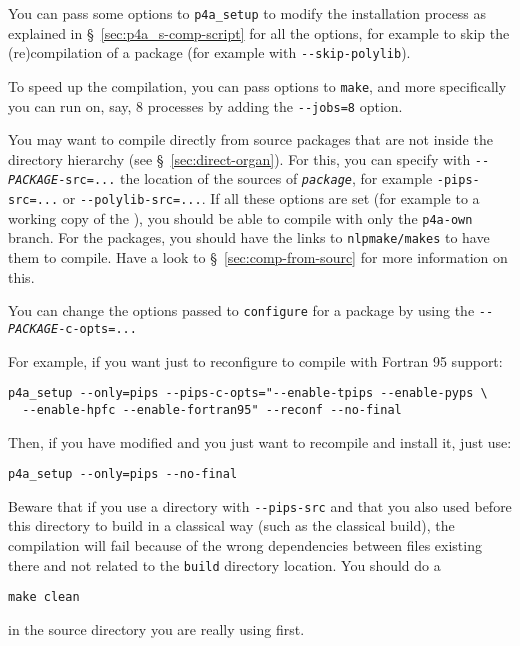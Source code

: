 \documentclass[a4paper]{article}
\begin{document}
You can pass some options to \verb|p4a_setup| to modify the
installation process as explained in \S~\ref{sec:p4a_s-comp-script} for
all the options, for example to skip the (re)compilation of a package (for
example with \verb/--skip-polylib/).

To speed up the compilation, you can pass options to \texttt{make}, and more
specifically you can run on, say, 8 processes by adding the
\verb/--jobs=8/ option.

You may want to compile \Apfa directly from source packages that are not
inside the \Apfa directory hierarchy (see \S~\ref{sec:direct-organ}). For
this, you can specify with \texttt{-{}-\emph{PACKAGE}-src=...} the
location of the sources of \texttt{\emph{package}}, for example
\verb|-pips-src=...| or \verb|--polylib-src=...|. If all these options are
set (for example to a working copy of the \Apips{} \Asvn), you should be
able to compile with only the \texttt{p4a-own} branch. For the \Apips
packages, you should have the links to \texttt{nlpmake/makes} to have them
to compile. Have a look to \S~\ref{sec:comp-from-sourc} for more
information on this.

You can change the options passed to \texttt{configure} for a package by
using the \texttt{-{}-\emph{PACKAGE}-c-opts=...}

For example, if you want just to reconfigure to compile \Apips with
Fortran 95 support:
\begin{verbatim}
p4a_setup --only=pips --pips-c-opts="--enable-tpips --enable-pyps \
  --enable-hpfc --enable-fortran95" --reconf --no-final
\end{verbatim}

Then, if you have modified \Apips and you just want to recompile and
install it, just use:
\begin{verbatim}
p4a_setup --only=pips --no-final
\end{verbatim}

Beware that if you use a \Apips directory with \verb|--pips-src| and that
you also used before this directory to build \Apips in a classical way
(such as the classical \Asvn build), the compilation will fail because of
the wrong dependencies between files existing there and not related to the
\Apfa \texttt{build} directory location. You should do a
\begin{verbatim}
make clean
\end{verbatim}
in the \Apips source directory you are really using first.
\end{document}
